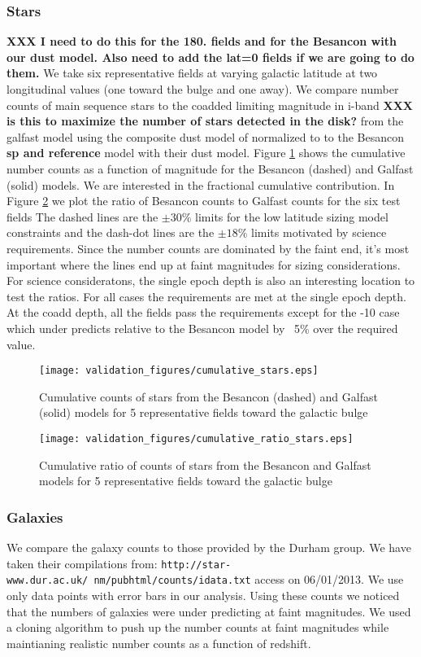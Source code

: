 \documentclass[]{article}
\begin{document}
\subsubsection{Stars}
{\bf XXX I need to do this for the 180. fields and for the Besancon with our dust model.  Also need to add the lat=0 fields if we are going to do them.}
We take six representative fields at varying galactic latitude at two longitudinal values (one toward the bulge and one away).  We compare number 
counts of main sequence stars to the coadded limiting magnitude in i-band {\bf XXX is this to maximize the number of stars detected in the disk?}
 from the galfast model using the composite dust model
of \cite{amores} normalized to \cite{sfd} to the Besancon {\bf sp and reference} model with their dust model.  Figure \ref{fig:scounts_0} shows 
the cumulative number counts as a function of magnitude for the Besancon (dashed) and Galfast (solid) models.  We are interested in the
fractional cumulative contribution.  In Figure \ref{fig:sratio_0} we plot the ratio of Besancon counts to Galfast counts for the six test fields
The dashed lines are the $\pm30\%$ limits for the low latitude sizing model constraints and the dash-dot lines are the $\pm18\%$ limits motivated
by science requirements.  Since the number counts are dominated by the faint end, it's most important where the lines end up at faint magnitudes for 
sizing considerations.  For science consideratons, the single epoch depth is also an interesting location to test the ratios.  For all cases the 
requirements are met at the single epoch depth.  At the coadd depth, all the fields pass the requirements except for the -10 case which under
predicts relative to the Besancon model by ~5\% over the required value.
\begin{figure}
\centering
\texttt{[image: validation\_figures/cumulative\_stars.eps]}
\caption{Cumulative counts of stars from the Besancon (dashed) and Galfast (solid) models for 5 representative fields toward the galactic bulge \label{fig:scounts_0}}
\end{figure}
\begin{figure}
\centering
\texttt{[image: validation\_figures/cumulative\_ratio\_stars.eps]}
\caption{Cumulative ratio of counts of stars from the Besancon and Galfast models for 5 representative fields toward the galactic bulge \label{fig:sratio_0}}
\end{figure}

\subsubsection{Galaxies \label{sec:galcounts}}
We compare the galaxy counts to those provided by the Durham group.  We have taken their compilations from:
{\tt http://star-www.dur.ac.uk/~nm/pubhtml/counts/idata.txt} access on 06/01/2013.  We use only data points with error bars in our analysis.  Using these counts
we noticed that the numbers of galaxies were under predicting at faint magnitudes.  We used a cloning algorithm to push up the number counts at faint magnitudes
while maintianing realistic number counts as a function of redshift.
\end{document}
